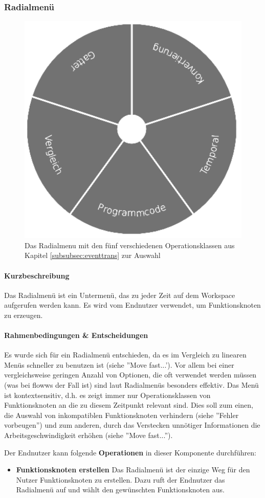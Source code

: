 \subsubsection{Radialmenü}

\begin{figure}[h]
  \centering
  \includegraphics[width=.4\textwidth]{bilder/chapter4/chapter4_3/radialmenu.pdf}
  \caption{Das Radialmenu mit den fünf verschiedenen Operationsklassen aus Kapitel \ref{subsubsec:eventtrans} zur Auswahl}
  \label{fig:radialmenu}
\end{figure}

\paragraph{Kurzbeschreibung} Das Radialmenü ist ein Untermenü, das zu jeder Zeit auf dem Workspace aufgerufen werden kann. Es wird vom Endnutzer verwendet, um Funktionsknoten zu erzeugen.

\paragraph{Rahmenbedingungen \& Entscheidungen} Es wurde sich für ein Radialmenü entschieden, da es im Vergleich zu linearen Menüs schneller zu benutzen ist (siehe ''Move fast...'). Vor allem bei einer vergleichsweise geringen Anzahl von Optionen, die oft verwendet werden müssen (was bei flowws der Fall ist) sind laut \cite{kurtenbach1994user} Radialmenüs besonders effektiv. Das Menü ist kontextsensitiv, d.h. es zeigt immer nur Operationsklassen von Funktionsknoten an die zu diesem Zeitpunkt relevant sind. Dies soll zum einen, die Auswahl von inkompatiblen Funktionsknoten verhindern (siehe ''Fehler vorbeugen'') und zum anderen, durch das Verstecken unnötiger Informationen die Arbeitsgeschwindigkeit erhöhen (siehe ''Move fast...'').

Der Endnutzer kann folgende \textbf{Operationen} in dieser Komponente durchführen: 
\begin{itemize}
    \item \textbf{Funktionsknoten erstellen} Das Radialmenü ist der einzige Weg für den Nutzer Funktionsknoten zu erstellen. Dazu ruft der Endnutzer das Radialmenü auf und wählt den gewünschten Funktionsknoten aus.
\end{itemize}

